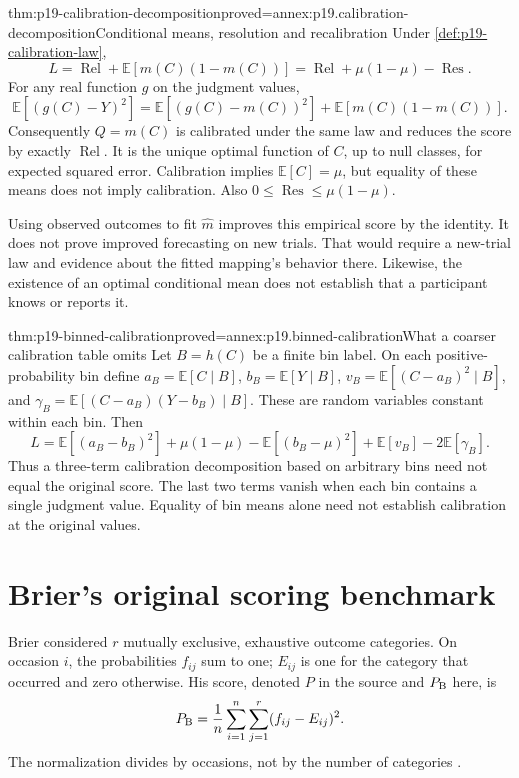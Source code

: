 \begin{hbtheorem}{thm:p19-calibration-decomposition}{proved=annex:p19.calibration-decomposition}{Conditional means, resolution and recalibration}
Under \cref{def:p19-calibration-law},
\[
 L=\operatorname{Rel}+\mathbb E[m(C)(1-m(C))]
  =\operatorname{Rel}+\mu(1-\mu)-\operatorname{Res}.
\]
For any real function \(g\) on the judgment values,
\[
 \mathbb E[(g(C)-Y)^2]
 =\mathbb E[(g(C)-m(C))^2]+\mathbb E[m(C)(1-m(C))].
\]
Consequently \(Q=m(C)\) is calibrated under the same law and reduces
the score by exactly \(\operatorname{Rel}\). It is the unique optimal
function of \(C\), up to null classes, for expected squared error.
Calibration implies \(\mathbb E[C]=\mu\), but equality of these means
does not imply calibration. Also
\(0\leq\operatorname{Res}\leq\mu(1-\mu)\).
\end{hbtheorem}

Using observed outcomes to fit \(\widehat m\) improves this empirical
score by the identity. It does not prove improved forecasting on new trials.
That would require a new-trial law and evidence about the fitted mapping's
behavior there. Likewise, the existence of an optimal conditional mean does
not establish that a participant knows or reports it.

\begin{hblemma}{thm:p19-binned-calibration}{proved=annex:p19.binned-calibration}{What a coarser calibration table omits}
Let \(B=h(C)\) be a finite bin label. On each positive-probability bin
define \(a_B=\mathbb E[C\mid B]\), \(b_B=\mathbb E[Y\mid B]\),
\(v_B=\mathbb E[(C-a_B)^2\mid B]\), and
\(\gamma_B=\mathbb E[(C-a_B)(Y-b_B)\mid B]\). These are random
variables constant within each bin. Then
\[
 L=\mathbb E[(a_B-b_B)^2]+\mu(1-\mu)
   -\mathbb E[(b_B-\mu)^2]+\mathbb E[v_B]-2\mathbb E[\gamma_B].
\]
Thus a three-term calibration decomposition based on arbitrary bins need
not equal the original score. The last two terms vanish when each bin
contains a single judgment value. Equality of bin means alone need not
establish calibration at the original values.
\end{hblemma}

\section{Brier's original scoring benchmark}
\label{sec:p19-brier-original}

Brier considered \(r\) mutually exclusive, exhaustive outcome categories.
On occasion \(i\), the probabilities \(f_{ij}\) sum to one; \(E_{ij}\)
is one for the category that occurred and zero otherwise. His score, denoted
\(P\) in the source and \(P_{\rm B}\) here, is
\[
 P_{\rm B}=\frac1n\sum_{i=1}^n\sum_{j=1}^r(f_{ij}-E_{ij})^2.
\]
The normalization divides by occasions, not by the number of categories
\cite[p.~1, eq.~(2)]{Brier1950Verification}.


